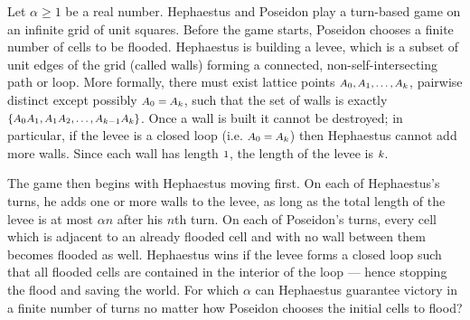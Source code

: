 Let $\alpha \geq 1$ be a real number. Hephaestus and Poseidon play a turn-based game on an infinite grid of unit squares. Before the game starts, Poseidon chooses a finite number of cells to be flooded. Hephaestus is building a levee, which is a subset of unit edges of the grid (called walls) forming a connected, non-self-intersecting path or loop. More formally, there must exist lattice points $\mbox{\footnotesize \(A_0, A_1, \dotsc, A_k\)}$,  pairwise distinct except possibly $\mbox{\footnotesize \(A_0 = A_k\)}$,  such that the set of walls is exactly $\mbox{\footnotesize \(\{A_0A_1, A_1A_2, \dotsc , A_{k-1}A_k\}\)}$. Once a wall is built it cannot be destroyed; in particular, if the levee is a closed loop (i.e. $\mbox{\footnotesize \(A_0 = A_k\)}$) then Hephaestus cannot add more walls. Since each wall has length $\mbox{\footnotesize \(1\)}$,  the length of the levee is $\mbox{\footnotesize \(k\)}$.

The game then begins with Hephaestus moving first. On each of Hephaestus’s turns, he adds one or more walls to the levee, as long as the total length of the levee is at most $\alpha n$ after his $n$th turn. On each of Poseidon’s turns, every cell which is adjacent to an already flooded cell and with no wall between them becomes flooded as well. Hephaestus wins if the levee forms a closed loop such that all flooded cells are contained in the interior of the loop — hence stopping the flood and saving the world. For which $\alpha$ can Hephaestus guarantee victory in a finite number of turns no matter how Poseidon chooses the initial cells to flood?
